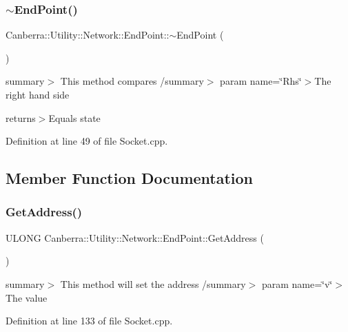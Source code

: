 \subsubsection{\texorpdfstring{$\sim$\+End\+Point()}{~EndPoint()}}
{\footnotesize\ttfamily Canberra\+::\+Utility\+::\+Network\+::\+End\+Point\+::$\sim$\+End\+Point (\begin{DoxyParamCaption}{ }\end{DoxyParamCaption})\hspace{0.3cm}{\ttfamily [virtual]}}

summary$>$ This method compares /summary$>$ param name=\char`\"{}\+Rhs\char`\"{}$>$The right hand side

returns$>$Equals state

Definition at line 49 of file Socket.\+cpp.



\subsection{Member Function Documentation}
\mbox{\label{class_canberra_1_1_utility_1_1_network_1_1_end_point_a149e4a7a23b4285d2f4752776679fc08_a149e4a7a23b4285d2f4752776679fc08}} 
\subsubsection{\texorpdfstring{Get\+Address()}{GetAddress()}}
{\footnotesize\ttfamily U\+L\+O\+NG Canberra\+::\+Utility\+::\+Network\+::\+End\+Point\+::\+Get\+Address (\begin{DoxyParamCaption}{ }\end{DoxyParamCaption})}

summary$>$ This method will set the address /summary$>$ param name=\char`\"{}v\char`\"{}$>$The value

Definition at line 133 of file Socket.\+cpp.

\mbox{\label{class_canberra_1_1_utility_1_1_network_1_1_end_point_a22818c23bbae490c36e0d388dde3dc2d_a22818c23bbae490c36e0d388dde3dc2d}} 
